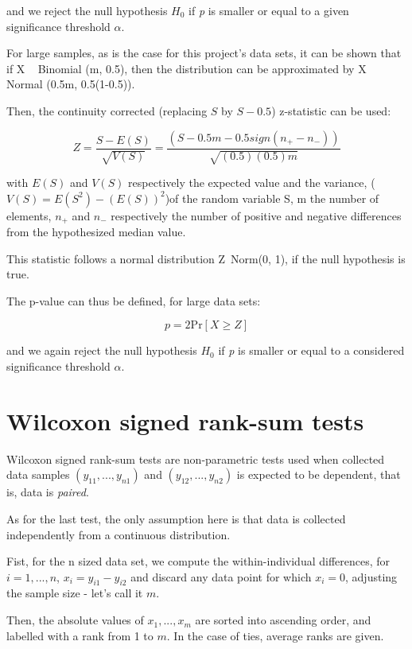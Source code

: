and we reject the null hypothesis $H_0$ if \textit{p} is smaller or equal to a given significance threshold $\alpha$.

For large samples, as is the case for this project's data sets, it can be shown that if X ~ Binomial (m, 0.5), then the distribution can be approximated by X ~ Normal (0.5m, 0.5(1-0.5)).

Then, the continuity corrected (replacing $S$ by $S-0.5$) z-statistic can be used:

\begin{equation}
Z=\dfrac{S-E(S)}{\sqrt{V(S)}}= \dfrac{(S-0.5m - 0.5 sign(n_+-n_-))}{\sqrt{(0.5)(0.5)m}}
\end{equation}

with $E(S)$ and $V(S)$ respectively the expected value and the variance, ($V(S)=E(S^2)-(E(S))^2$)of the random variable S, m the number of elements, $n_{+}$ and $n_{-}$ respectively the number of positive and negative differences from the hypothesized median value.

This statistic follows a normal distribution Z~Norm(0, 1), if the null hypothesis is true. 

The p-value can thus be defined, for large data sets:

\begin{equation}
p = 2 \text{Pr}\left[X \geq Z\right]
\end{equation}

and we again reject the null hypothesis $H_0$ if \textit{p} is smaller or equal to a considered significance threshold $\alpha$.

\section{Wilcoxon signed rank-sum tests}
\label{subsec:subbsectionC}

Wilcoxon signed rank-sum tests are non-parametric tests used when collected data samples $(y_{11},...,y_{n1})$ and $(y_{12},...,y_{n2})$ is expected to be dependent, that is, data is \textit{paired}.

As for the last test, the only assumption here is that data is collected independently from a continuous distribution.

Fist, for the n sized data set, we compute the within-individual differences, for $i=1,...,n$, $x_i = y_{i1} - y_{i2}$ and discard any data point for which $x_i=0$, adjusting the sample size - let's call it $m$.

Then, the absolute values of $x_1,...,x_m$ are sorted into ascending order, and labelled with a rank from 1 to $m$. In the case of ties, average ranks are given.

